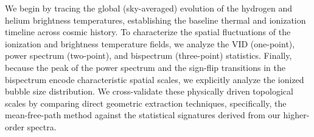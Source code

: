 \documentclass[apj,twocolumn, appendixfloats, twocolappendix, numberedappendix, tighten]{openjournal}
\begin{document}
We begin by tracing the global (sky-averaged) evolution of the hydrogen and helium brightness temperatures, establishing the baseline thermal and ionization timeline across cosmic history. To characterize the spatial fluctuations of the ionization and brightness temperature fields, we analyze the VID (one-point), power spectrum (two-point), and bispectrum (three-point) statistics. Finally, because the peak of the power spectrum and the sign-flip transitions in the bispectrum encode characteristic spatial scales, we explicitly analyze the ionized bubble size distribution. We cross-validate these physically driven topological scales by comparing direct geometric extraction techniques, specifically, the mean-free-path method \citep[][]{Mesinger2007, Neyer2024, Neyer2026} against the statistical signatures derived from our higher-order spectra.
\end{document}
